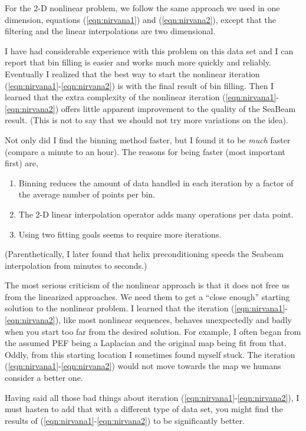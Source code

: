 \par
For the 2-D nonlinear problem,
we follow the same approach we used in one dimension,
equations
(\ref{eqn:nirvana1}) and
(\ref{eqn:nirvana2}),
except that the filtering and the linear interpolations
are two dimensional.

\par
I have had considerable experience with this problem on this data set
and I can report that bin filling is easier
and works much more quickly and reliably.
Eventually I realized that the best way to start
the nonlinear iteration (\ref{eqn:nirvana1}-\ref{eqn:nirvana2}) is with
the final result of bin filling.
Then I learned that the extra complexity
of the nonlinear iteration (\ref{eqn:nirvana1}-\ref{eqn:nirvana2})
offers little apparent improvement to the quality of the
SeaBeam result.
(This is not to say that we should not try more variations on the idea).
\par
Not only did I find the binning method faster,
but I found it to be {\it much}
faster (compare a minute to an hour).
The reasons for being faster (most important first) are,
\begin{enumerate}
\item Binning reduces the amount of data handled in each iteration
        by a factor of the average number of points per bin.
\item The 2-D linear interpolation operator adds many operations per data point.
\item Using two fitting goals seems to require more iterations.
\end{enumerate}
(Parenthetically,
I later found that helix preconditioning speeds the Seabeam interpolation
from minutes to seconds.)
\par
The most serious criticism of the nonlinear approach
is that it does not free us from the linearized approaches.
We need them to get a ``close enough'' starting solution
to the nonlinear problem.
I learned that the iteration (\ref{eqn:nirvana1}-\ref{eqn:nirvana2}),
like most nonlinear sequences,
behaves unexpectedly and badly
when you start too far from the desired solution.
For example, I often began from the assumed PEF being a Laplacian
and the original map being fit from that.
Oddly, from this starting location I sometimes found myself stuck.
The iteration (\ref{eqn:nirvana1}-\ref{eqn:nirvana2}) would not move towards the map
we humans consider a better one.
\par
Having said all those bad things about iteration
(\ref{eqn:nirvana1}-\ref{eqn:nirvana2}), I must hasten to add that
with a different type of data set, you might find the results of
(\ref{eqn:nirvana1}-\ref{eqn:nirvana2}) to be significantly better.

